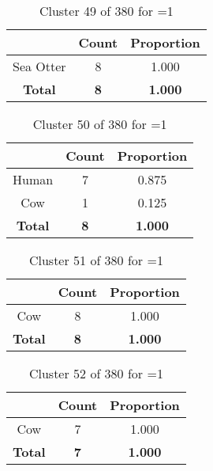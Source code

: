 \begin{table}[ht!]
\centering
\begin{tabular}{|c|c|c|}
\hline
\bf \Spec{} &\bf Count &\bf Proportion\\ \hline \hline
Sea Otter & 8 & 1.000\\ \hline
\hline
\bf Total & \bf 8 & \bf 1.000\\ \hline
\end{tabular}
\label{tab:cluster:49:1}
\caption{Cluster 49 of 380 for \minneigh{}=1}
\end{table}

\clearpage
\begin{table}[ht!]
\centering
\begin{tabular}{|c|c|c|}
\hline
\bf \Spec{} &\bf Count &\bf Proportion\\ \hline \hline
Human & 7 & 0.875\\ \hline
Cow & 1 & 0.125\\ \hline
\hline
\bf Total & \bf 8 & \bf 1.000\\ \hline
\end{tabular}
\label{tab:cluster:50:1}
\caption{Cluster 50 of 380 for \minneigh{}=1}
\end{table}

\begin{table}[ht!]
\centering
\begin{tabular}{|c|c|c|}
\hline
\bf \Spec{} &\bf Count &\bf Proportion\\ \hline \hline
Cow & 8 & 1.000\\ \hline
\hline
\bf Total & \bf 8 & \bf 1.000\\ \hline
\end{tabular}
\label{tab:cluster:51:1}
\caption{Cluster 51 of 380 for \minneigh{}=1}
\end{table}

\begin{table}[ht!]
\centering
\begin{tabular}{|c|c|c|}
\hline
\bf \Spec{} &\bf Count &\bf Proportion\\ \hline \hline
Cow & 7 & 1.000\\ \hline
\hline
\bf Total & \bf 7 & \bf 1.000\\ \hline
\end{tabular}
\label{tab:cluster:52:1}
\caption{Cluster 52 of 380 for \minneigh{}=1}
\end{table}

